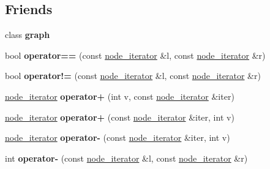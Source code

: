 \subsection*{Friends}
\begin{DoxyCompactItemize}
\item 
\hypertarget{classgraph_1_1node__iterator_ab8b0dbc1b36724e5e4635ac651c218cb}{class {\bfseries graph}}\label{classgraph_1_1node__iterator_ab8b0dbc1b36724e5e4635ac651c218cb}

\item 
\hypertarget{classgraph_1_1node__iterator_a8a4971ebadf282168d84a07d4914c93c}{bool {\bfseries operator==} (const \hyperlink{classgraph_1_1node__iterator}{node\+\_\+iterator} \&l, const \hyperlink{classgraph_1_1node__iterator}{node\+\_\+iterator} \&r)}\label{classgraph_1_1node__iterator_a8a4971ebadf282168d84a07d4914c93c}

\item 
\hypertarget{classgraph_1_1node__iterator_ad75d23092c9ff953c3738f3454ccd9fb}{bool {\bfseries operator!=} (const \hyperlink{classgraph_1_1node__iterator}{node\+\_\+iterator} \&l, const \hyperlink{classgraph_1_1node__iterator}{node\+\_\+iterator} \&r)}\label{classgraph_1_1node__iterator_ad75d23092c9ff953c3738f3454ccd9fb}

\item 
\hypertarget{classgraph_1_1node__iterator_a6b1761a28d4367ba919c85f9f2c8d0e4}{\hyperlink{classgraph_1_1node__iterator}{node\+\_\+iterator} {\bfseries operator+} (int v, const \hyperlink{classgraph_1_1node__iterator}{node\+\_\+iterator} \&iter)}\label{classgraph_1_1node__iterator_a6b1761a28d4367ba919c85f9f2c8d0e4}

\item 
\hypertarget{classgraph_1_1node__iterator_a08e8068052fc1729d5b6a350e9dd1346}{\hyperlink{classgraph_1_1node__iterator}{node\+\_\+iterator} {\bfseries operator+} (const \hyperlink{classgraph_1_1node__iterator}{node\+\_\+iterator} \&iter, int v)}\label{classgraph_1_1node__iterator_a08e8068052fc1729d5b6a350e9dd1346}

\item 
\hypertarget{classgraph_1_1node__iterator_a0ac6efe2377fcbb51fe24924ce89608d}{\hyperlink{classgraph_1_1node__iterator}{node\+\_\+iterator} {\bfseries operator-\/} (const \hyperlink{classgraph_1_1node__iterator}{node\+\_\+iterator} \&iter, int v)}\label{classgraph_1_1node__iterator_a0ac6efe2377fcbb51fe24924ce89608d}

\item 
\hypertarget{classgraph_1_1node__iterator_aca04993c54f56e95d1be14feaeb7766f}{int {\bfseries operator-\/} (const \hyperlink{classgraph_1_1node__iterator}{node\+\_\+iterator} \&l, const \hyperlink{classgraph_1_1node__iterator}{node\+\_\+iterator} \&r)}\label{classgraph_1_1node__iterator_aca04993c54f56e95d1be14feaeb7766f}


\end{DoxyCompactItemize}
